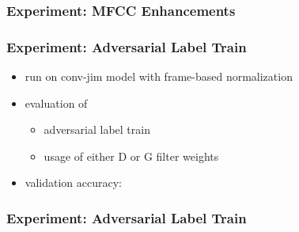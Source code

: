 \begin{frame}
  \frametitle{Experiment: MFCC Enhancements}
  
\end{frame}

\begin{frame}
  \frametitle{Experiment: Adversarial Label Train}
  \begin{itemize}
    \item run on conv-jim model with frame-based normalization
    \item evaluation of
    \begin{itemize}
     \item adversarial label train
     \item usage of either D or G filter weights
    \end{itemize}
    \item validation accuracy:
    \vspace{-0.5cm}
    \begin{figure}[!ht]
    \centering
    \end{figure}
  \end{itemize}
\end{frame}

\begin{frame}
  \frametitle{Experiment: Adversarial Label Train}
  \centering \vfill
  
\end{frame}

